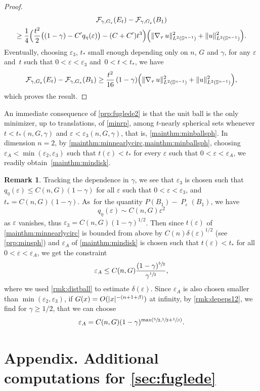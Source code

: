 \documentclass[JEP,XML,SOM,Unicode,published]{cedram}
\numberwithin{equation}{section}
\theoremstyle{plain}
\theoremstyle{definition}
\newtheorem{rmk}[thm]{Remark}
\newcommand{\bbS}{\mathbb{S}}
\newcommand{\calF}{{\mathcal{F}}}
\let\eps\varepsilon
\newcommand{\grad}{\nabla}
\DeclareMathOperator{\Per}{\mathit{P}}
\DeclarePairedDelimiter{\abs}{\lvert}{\rvert}
\DeclarePairedDelimiter{\norm}{\lVert}{\rVert}
\begin{document}
\begin{proof}
\begin{multline*}
\calF_{\gamma,G_\eps}(E_t)-\calF_{\gamma,G_\eps}(B_1)\\
\geq \frac{1}{4} \Bigl(\frac{t^2}{2}\big((1-\gamma)-C'q_\eta(\eps)\big)-(C+C')t^3 \Bigr)
\Bigl(\norm{\grad_\tau\,u}_{L^2(\bbS^{n-1})}^2+\norm{u}_{L^2(\bbS^{n-1})}^2 \Bigr).
\end{multline*}
Eventually, choosing $\eps_3$, $t_*$ small enough depending only on $n$, $G$ and $\gamma$, for any $\eps$ and~$t$ such that
$0<\eps<\eps_3$ and~$0< t< t_*$, we have
\[
\calF_{\gamma,G_\eps}(E_t)-\calF_{\gamma,G_\eps}(B_1) \geq \frac{t^2}{16}\,(1-\gamma)
\Bigl(\norm{\grad_\tau\,u}_{L^2(\bbS^{n-1})}^2+\norm{u}_{L^2(\bbS^{n-1})}^2 \Bigr),
\]
which proves the result.
\end{proof}

An immediate consequence of \cref{prp:fuglede2} is that the unit ball is the only minimizer, up to
translations, of \cref{minrp}, among $t$-nearly spherical sets whenever $t<t_*(n,G,\gamma)$ and
$\eps<\eps_3(n,G,\gamma)$, that is, \cref{mainthm:minballsph}. In dimension $n=2$, by
\cref{mainthm:minnearlycirc,mainthm:minballsph}, choosing $\eps_A<\min(\eps_2,\eps_3)$
such that $t(\eps)<t_*$ for every $\eps$ such that $0<\eps<\eps_A$, we readily obtain~\cref{mainthm:mindisk}.

\begin{rmk}\label{rmk:depepsstar}
Tracking the dependence in $\gamma$, we see that $\eps_3$ is chosen such that
$q_\eta(\eps)\leq C(n,G)(1-\gamma)$ for all $\eps$ such that $0<\eps<\eps_3$, and $t_*= C(n,G)(1-\gamma)$. As~for the
quantity $P(B_1)-\Per_{\eps}(B_1)$, we have
\[
q_\eta(\eps) \sim C(n,G)\eps^2
\]
as $\eps$ vanishes, thus $\eps_3=C(n,G)(1-\gamma)^{1/2}$. Then since $t(\eps)$ of
\cref{mainthm:minnearlycirc} is bounded from above by $C(n)\delta(\eps)^{1/2}$ (see
\cref{prp:minsph}) and $\eps_A$ of \cref{mainthm:mindisk} is chosen such that $t(\eps)<t_*$ for all
$0<\eps<\eps_A$, we get the constraint
\[
\eps_A\leq C(n,G) \frac{(1-\gamma)^{\sfrac{5}{2}}}{\gamma^{\sfrac{1}{2}}},
\]
where we used \cref{rmk:distball} to estimate $\delta(\eps)$.
Since $\eps_A$ is also chosen smaller than $\min(\eps_2,\eps_3)$, if
$G(x)=O(\abs{x}^{-(n+1+\beta)})$ at infinity, by \cref{rmk:depeps12}, we find for $\gamma\geq 1/2$,
that we can choose
\[
\eps_A=C(n,G)(1-\gamma)^{\max\left(\sfrac{5}{2},\sfrac{1}{2} +\sfrac{1}{\beta}\right)}.
\]
\end{rmk}

\appendix
{}
\section*{Appendix. Additional computations for \texorpdfstring{{\cref{sec:fuglede}}}{Section 4}}
\end{document}
